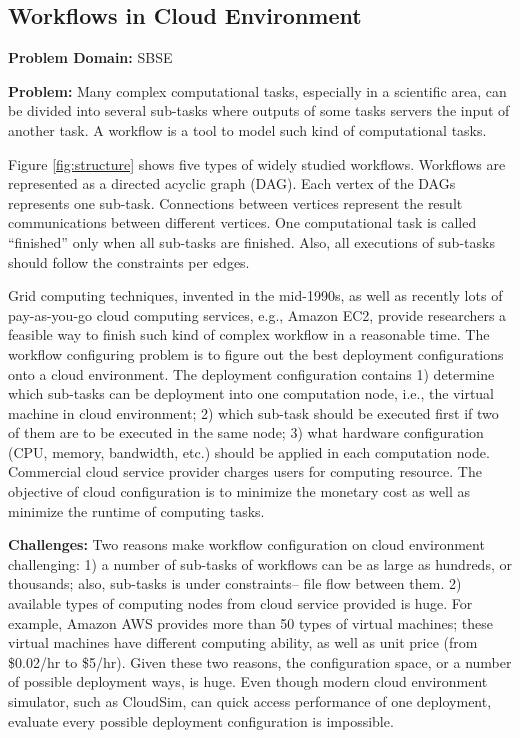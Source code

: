 \documentclass[sigconf,anonymous,review]{acmart}
\begin{document}


    \subsection{Workflows in Cloud Environment}
\textbf{Problem Domain: } SBSE


\noindent\textbf{Problem:} Many complex computational tasks, especially in a scientific area, can be divided into several sub-tasks where outputs of some tasks servers the input of another task. A workflow is a tool to
model such kind of computational tasks.



Figure \ref{fig:structure} shows five types of widely studied workflows. Workflows are represented as a directed acyclic graph (DAG). Each vertex of the DAGs represents one sub-task. Connections between vertices represent the result communications between different vertices. One computational task is called ``finished'' only when
all sub-tasks are finished. Also, all executions of sub-tasks should follow the constraints per edges.

Grid computing techniques, invented in the mid-1990s, as well as recently lots of pay-as-you-go cloud computing services, e.g., Amazon EC2, provide researchers a feasible way to finish such kind of complex workflow in a reasonable time.
The workflow configuring problem is to figure out the best deployment configurations onto a cloud environment. The deployment configuration
contains 1) determine which sub-tasks can be deployment into
one computation node, i.e., the virtual machine in cloud environment; 2) which sub-task should be executed first if two of them are to be executed in the same node; 3) what hardware configuration (CPU, memory, bandwidth, etc.) should be applied in each computation node. Commercial cloud service provider charges users for computing resource. 
The objective of cloud configuration is to minimize the monetary cost as well as minimize the runtime of computing tasks.


\noindent\textbf{Challenges: } 
Two reasons make workflow configuration on cloud environment challenging: 1)  a number of sub-tasks of workflows can be as large as hundreds, or thousands; also, sub-tasks is under constraints-- file flow between them. 2) available types of
computing nodes from cloud service provided is huge.
For example, Amazon AWS provides more than 50 types of virtual machines; these
virtual machines have different computing ability, as well as unit price (from \$0.02/hr to \$5/hr).
Given these two reasons,
the configuration space, or a number of possible deployment ways, is huge.
Even though modern cloud environment simulator, such as CloudSim, can quick
access performance of one deployment, evaluate every
possible deployment configuration is impossible.
\end{document}
